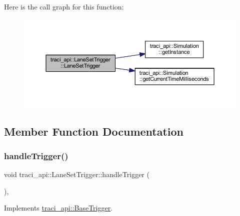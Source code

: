 Here is the call graph for this function\+:
\nopagebreak
\begin{figure}[H]
\begin{center}
\leavevmode
\includegraphics[width=350pt]{classtraci__api_1_1_lane_set_trigger_a2af85a3a539f5a6c0624085c90cd6fa8_cgraph}
\end{center}
\end{figure}


\subsection{Member Function Documentation}
\mbox{\label{classtraci__api_1_1_lane_set_trigger_a9bc702339daf8aa0d905e3bab5ff2dc3}} 
\subsubsection{\texorpdfstring{handle\+Trigger()}{handleTrigger()}}
{\footnotesize\ttfamily void traci\+\_\+api\+::\+Lane\+Set\+Trigger\+::handle\+Trigger (\begin{DoxyParamCaption}{ }\end{DoxyParamCaption})\hspace{0.3cm}{\ttfamily [override]}, {\ttfamily [virtual]}}



Implements \hyperlink{classtraci__api_1_1_base_trigger_a2de2824fb1d228d4c04aa15c272017a5}{traci\+\_\+api\+::\+Base\+Trigger}.

\mbox{\label{classtraci__api_1_1_lane_set_trigger_ae606560cb760e12b0f1a86407f614e18}} 

